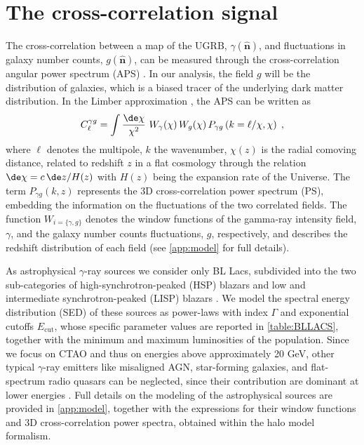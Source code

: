 \section{The cross-correlation signal}
\label{sec:formalism}

The cross-correlation between a map of the UGRB, $\gamma(\hat{\bm n})$, and fluctuations in galaxy number counts, $g(\hat{\bm n})$, can be measured through the cross-correlation angular power spectrum (APS) \cite{camera2013novel,camera2015tomographic,fornengo2014particle}. In our analysis, the field $g$ will be the distribution of galaxies, which is a biased tracer of the underlying dark matter distribution. 
In the Limber approximation \citep{1953ApJ...117..134L,1992ApJ...388..272K,1998ApJ...498...26K}, the APS can be written as~{\cite{camera2013novel,camera2015tomographic,fornengo2014particle}}
\begin{equation}
 C_\ell^{\gamma g}=\int \frac{\de\chi}{\chi^2}\,\,W_{\gamma}(\chi)\, W_g(\chi)\,P_{\gamma g}\left(k=\ell/\chi,\chi\right)\;,
\label{eq:clfin}    
\end{equation}
%
 where $\ell$ denotes the multipole, $k$ the wavenumber, $\chi(z)$ is the radial comoving distance, related to redshift $z$ in a flat cosmology through the relation $\de\chi=c\,\de z/H(z)$ with $H(z)$ being the expansion rate of the Universe. The term $P_{\gamma g}(k,z)$ represents the 3D cross-correlation power spectrum (PS), embedding the information on the fluctuations of the two correlated fields. The function $W_{i=\{\gamma,g\}}$ denotes the window functions of the gamma-ray intensity field, $\gamma$, and the galaxy number counts fluctuations, $g$, {respectively, and describes the redshift distribution of each field} (see {\cref{app:model}} for full details).
 
As astrophysical $\gamma$-ray sources we consider only BL Lacs, subdivided into the two sub-categories of high-synchrotron-peaked (HSP) blazars and low and intermediate synchrotron-peaked (LISP) blazars \cite{DiMauro:2013zfa}.
We model the spectral energy distribution (SED) of these sources as power-laws with index $\varGamma$ and exponential cutoffs $E_\textrm{cut}$, whose specific parameter values are reported in \cref{table:BLLACS}, together with the minimum and maximum luminosities of the population.
Since we focus on CTAO and thus on energies above approximately {20} GeV, 
other typical $\gamma$-ray emitters like misaligned AGN, star-forming galaxies, and flat-spectrum radio quasars can be neglected, since their contribution are dominant at lower energies \cite{Fornasa_2015}. Full details on the modeling of the astrophysical sources are provided in {\cref{app:model}}, together with the expressions for their window functions and 3D cross-correlation power spectra, obtained within the halo model formalism.

